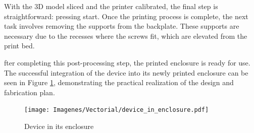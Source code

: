 With the 3D model sliced and the printer calibrated, the final step is straightforward: pressing 
start. Once the printing process is complete, the next task involves removing the supports from 
the backplate. These supports are necessary due to the recesses where the screws fit, which are 
elevated from the print bed.

fter completing this post-processing step, the printed enclosure is ready for use. The successful 
integration of the device into its newly printed enclosure can be seen in Figure 
\ref{fig:device_in_enclosure}, demonstrating the practical realization of the design and 
fabrication plan.

\begin{figure}[h]
	\centering
	\texttt{[image: Imagenes/Vectorial/device\_in\_enclosure.pdf]}
	\caption{Device in its enclosure}
	\label{fig:device_in_enclosure}
\end{figure}
